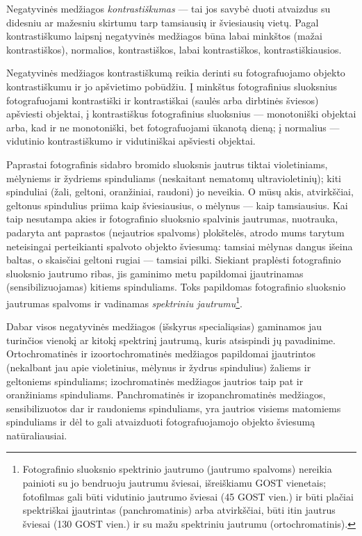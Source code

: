 \documentclass{book}
\begin{document}
					Negatyvinės medžiagos \textit{kontrastiškumas} --- tai jos savybė duoti atvaizdus su didesniu ar mažesniu skirtumu tarp tamsiausių ir šviesiausių vietų. Pagal kontrastiškumo laipsnį negatyvinės medžiagos būna labai minkštos (mažai kontrastiškos), normalios, kontrastiškos, labai kontrastiškos, kontrastiškiausios.

					Negatyvinės medžiagos kontrastiškumą reikia derinti su fotografuojamo objekto kontrastiškumu ir jo apšvietimo pobūdžiu. Į minkštus fotografinius sluoksnius fotografuojami kontrastiški ir kontrastiškai (saulės arba dirbtinės šviesos) apšviesti objektai, į kontrastiškus fotografinius sluoksnius --- monotoniški objektai arba, kad ir ne monotoniški, bet fotografuojami ūkanotą dieną; į normalius --- vidutinio kontrastiškumo ir vidutiniškai apšviesti objektai.

					Paprastai fotografinis sidabro bromido sluoksnis jautrus tiktai violetiniams, mėlyniems ir žydriems spinduliams (neskaitant nematomų ultravioletinių); kiti spinduliai (žali, geltoni, oranžiniai, raudoni) jo neveikia. O mūsų akis, atvirkščiai, geltonus spindulius priima kaip šviesiausius, o mėlynus --- kaip tamsiausius. Kai taip nesutampa akies ir fotografinio sluoksnio spalvinis jautrumas, nuotrauka, padaryta ant paprastos (nejautrios spalvoms) plokštelės, atrodo mums tarytum neteisingai perteikianti spalvoto objekto šviesumą: tamsiai mėlynas dangus išeina baltas, o skaisčiai geltoni rugiai --- tamsiai pilki. Siekiant praplėsti fotografinio sluoksnio jautrumo ribas, jis gaminimo metu papildomai įjautrinamas (sensibilizuojamas) kitiems spinduliams. Toks papildomas fotografinio sluoksnio jautrumas spalvoms ir vadinamas \textit{spektriniu jautrumu}\footnote{Fotografinio sluoksnio spektrinio jautrumo (jautrumo spalvoms) nereikia painioti su jo bendruoju jautrumu šviesai, išreiškiamu GOST vienetais; fotofilmas gali būti vidutinio jautrumo šviesai (45 GOST vien.) ir būti plačiai spektriškai įjautrintas (panchromatinis) arba atvirkščiai, būti itin jautrus šviesai (130 GOST vien.) ir su mažu spektriniu jautrumu (ortochromatinis).}.

					Dabar visos negatyvinės medžiagos (išskyrus specialiąsias) gaminamos jau turinčios vienokį ar kitokį spektrinį jautrumą, kuris atsispindi jų pavadinime. Ortochromatinės ir izoortochromatinės medžiagos papildomai įjautrintos (nekalbant jau apie violetinius, mėlynus ir žydrus spindulius) žaliems ir geltoniems spinduliams; izochromatinės medžiagos jautrios taip pat ir oranžiniams spinduliams. Panchromatinės ir izopanchromatinės medžiagos, sensibilizuotos dar ir raudoniems spinduliams, yra jautrios visiems matomiems spinduliams ir dėl to gali atvaizduoti fotografuojamojo objekto šviesumą natūraliausiai.
\end{document}
